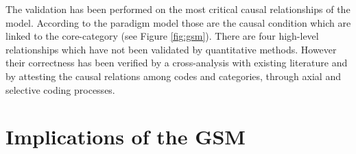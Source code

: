 \documentclass[10pt,journal,letterpaper,compsoc]{IEEEtran}
\begin{document}
The validation has been performed on the most critical  causal relationships of
the model. According to the paradigm model those are the causal condition which
are linked to the core-category (see Figure \ref{fig:gsm}). There are four
high-level relationships  which have not been validated by quantitative
methods. However their correctness has been verified by a cross-analysis with
existing literature and by attesting the causal relations among codes and
categories, through axial and selective coding processes.


\section{Implications of the GSM} %
\label{sect:theory:impl}


\end{document}
